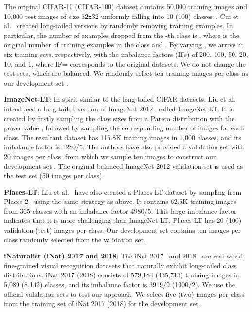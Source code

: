 \vspace{-5pt}
\begin{description} \setlength\itemsep{-1pt}

\item[Long-Tailed CIFAR (CIFAR-LT):] The original CIFAR-10 (CIFAR-100) dataset contains 50,000 training images and 10,000 test images of size 32x32 uniformly falling into 10 (100) classes~\cite{Krizhevsky-CIFAR}. Cui et al.~\cite{CBLoss} created long-tailed versions by randomly removing training examples. In particular, the number of examples dropped from the -th class is , where  is the original number of training examples in the class and . By varying , we arrive at six training sets, respectively, with the imbalance factors (IFs) of 200, 100, 50, 20, 10, and 1, where IF= corresponds to the original datasets. We do not change the test sets, which are balanced. We randomly select ten training images per class as our development set .

\item \textbf{ImageNet-LT}: In spirit similar to the long-tailed CIFAR datasets, Liu et al.~\cite{OLTR} introduced a long-tailed version of ImageNet-2012~\cite{ImageNet} called ImageNet-LT. It is created by firstly sampling the class sizes from a Pareto distribution with the power value , followed by sampling the corresponding number of images for each class. The resultant dataset has 115.8K training images in 1,000 classes, and its imbalance factor is 1280/5. The authors have also provided a validation set with 20 images per class, from which we sample ten images to construct our development set . The original balanced ImageNet-2012 validation set is used as the test set (50 images per class). 

\item \textbf{Places-LT}: Liu et al.~\cite{OLTR} have also created a Places-LT dataset by sampling from Places-2~\cite{Places2} using the same strategy as above. It contains 62.5K training images from 365 classes with an imbalance factor 4980/5. This large imbalance factor indicates that it is more challenging than ImageNet-LT. Places-LT has 20 (100) validation (test) images per class. Our development set  contains ten images per class randomly selected from the validation set.


\item \textbf{iNaturalist (iNat) 2017 and 2018}: The iNat 2017~\cite{inaturalist2017} and 2018~\cite{inaturalist} are real-world fine-grained visual recognition datasets that naturally exhibit long-tailed class distributions. iNat 2017 (2018) consists of 579,184 (435,713) training images in 5,089 (8,142) classes, and its imbalance factor is 3919/9 (1000/2). We use the official validation sets to test our approach. We select five (two) images per class from the training set of iNat 2017 (2018) for the development set.
\vspace{-5pt}
\end{description}

